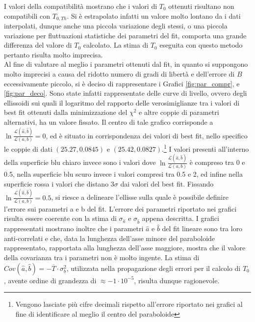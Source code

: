 \documentclass[a4paper,11pt,oneside]{article}
\begin{document}
I valori della compatibilità mostrano che i valori di $T_0$ ottenuti risultano non compatibili con $T_{0, Th}$.
Si è estrapolato infatti un valore molto lontano da i dati interpolati, dunque anche una piccola variazione degli stessi, o una piccola variazione per fluttuazioni statistiche dei parametri del fit, comporta una grande differenza del valore di $T_0$ calcolato. La stima di $T_0$ eseguita con questo metodo pertanto risulta molto imprecisa.\\
Al fine di valutare al meglio i parametri ottenuti dal fit, in quanto si suppongono molto imprecisi a causa del ridotto numero di gradi di libertà e dell'errore di $B$ eccessivamente piccolo, si è deciso di rappresentare i Grafici \ref{fig:par_compr}, e \ref{fig:par_deco}. 
Sono state infatti rappresentate delle curve di livello, ovvero degli ellissoidi sui quali il logaritmo del rapporto delle verosimiglianze tra i valori di best fit ottenuti dalla minimizzazione del $\chi^2$ e altre coppie di parametri alternativi, ha un valore fissato. Il centro di tale grafico corrisponde a $\ln\frac{\mathcal{L}(\hat a,\hat b)}{\mathcal{L}(a,b)}=0$, ed è situato in corrispondenza dei valori di best fit, nello specifico le coppie di dati $(25.27,0.0845)$ e $(25.42, 0.0827)$.\footnote{Vengono lasciate più cifre decimali rispetto all'errore riportato nei grafici al fine di identificare al meglio il centro del paraboloide}
I valori presenti all'interno della superficie blu chiaro invece sono i valori dove $\ln\frac{\mathcal{L}(\hat a,\hat b)}{\mathcal{L}(a,b)}$ è compreso tra 0 e 0.5, nella superficie blu scuro invece i valori compresi tra 0.5 e 2, ed infine nella superficie rossa i valori che distano $3\sigma$ dai valori del best fit. Fissando $\ln\frac{\mathcal{L}(\hat a,\hat b)}{\mathcal{L}(a,b)}= 0.5$, si riesce a delineare l'ellisse sulla quale è possibile definire l'errore sui parametri a e b del fit. L'errore dei parametri riportato nei grafici risulta essere coerente con la stima di $\sigma_{\hat a}$ e $\sigma_{\hat b}$ appena descritta. I grafici rappresentati mostrano inoltre che i parametri $\hat a$ e $\hat b$ del fit lineare sono  tra loro anti-correlati e che, data la lunghezza dell'asse minore del paraboloide rappresentato, rapportata alla lunghezza dell'asse maggiore, mostra che il valore della covarianza tra i parametri non è molto ingente. 
La stima di $Cov(\hat a, \hat b)= -\overline{T}\cdot \sigma_b^2$, utilizzata nella propagazione degli errori per il calcolo di $T_0$, avente ordine di grandezza di $\approx -1\cdot10^{-5}$, risulta dunque ragionevole.
\end{document}
